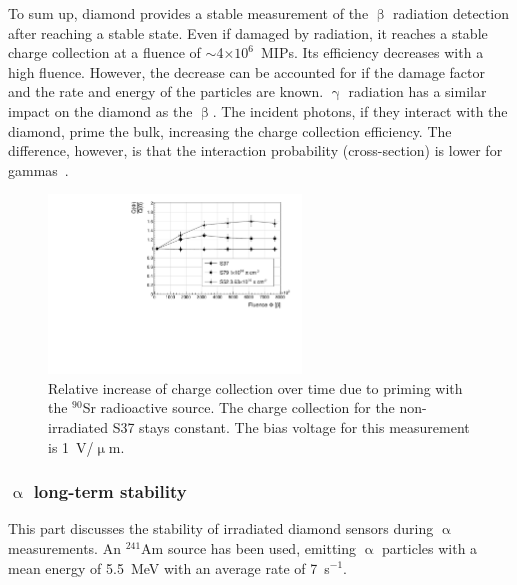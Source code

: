 
To sum up, diamond provides a stable measurement of the $\upbeta$ radiation detection after reaching a stable state. Even if damaged by radiation, it reaches a stable charge collection at a fluence of $\sim$4$\times10^6$~MIPs. Its efficiency decreases with a high fluence. %
However, the decrease can be accounted for if the damage factor and the rate and energy of the particles are known. $\upgamma$ radiation has a similar impact on the diamond as the $\upbeta$. The incident photons, if they interact with the diamond, prime the bulk, increasing the charge collection efficiency. The difference, however, is that the interaction probability (cross-section) is lower for gammas~\cite{sarin2014comprehensive,Griesmayer20121997}.

\begin{figure}[!t]
\begin{center}
\includegraphics[width=0.6\textwidth]{03_measurement_results/plots/ccdpriming}
\caption{Relative increase of charge collection over time due to priming with the $^{90}$Sr radioactive source. The charge collection for the non-irradiated S37 stays constant. The bias voltage for this measurement is 1~V/$\upmu$m.}
\label{fig:ccincrease}
\end{center}
\end{figure}

\subsubsection{$\upalpha$ long-term stability}
This part discusses the stability of irradiated diamond sensors during $\upalpha$ measurements. An $^{241}$Am source has been used, emitting $\upalpha$ particles with a mean energy of 5.5~MeV with an average rate of 7~s$^{-1}$. 

